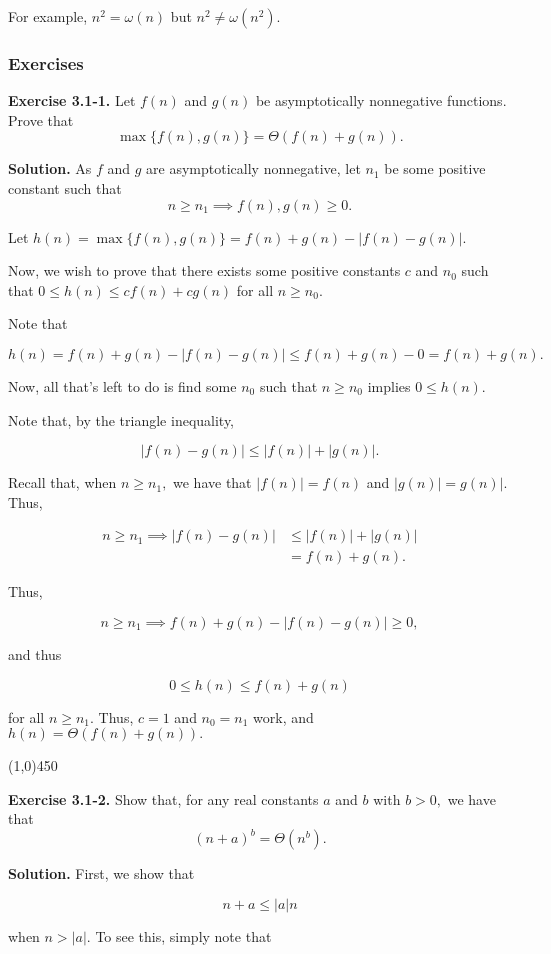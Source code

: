 \documentclass{article}
\newcommand{\exec}[2]
{\textbf{Exercise #1.} #2

\textbf{Solution.}}
\newcommand{\bardiv}{\begin{center}
\line(1,0){450}
\end{center}}
\begin{document}
\vspace{5mm}

For example, $n^2 = \omega(n)$ but $n^2 \neq \omega(n^2).$

\subsubsection{Exercises}

\exec{3.1-1}{Let $f(n)$ and $g(n)$ be asymptotically nonnegative functions. Prove that $$\max\{ f(n), g(n) \} = \Theta(f(n) + g(n)).$$}
As $f$ and $g$ are asymptotically nonnegative, let $n_1$ be some positive constant such that $$n \geq n_1 \implies f(n), g(n) \geq 0.$$

Let $h(n) = \max\{f(n), g(n)\} = f(n) + g(n) - |f(n) - g(n)|.$

Now, we wish to prove that there exists some positive constants $c$ and $n_0$ such that $0 \leq h(n) \leq cf(n) + cg(n)$ for all $n \geq n_0.$

Note that

$$h(n) = f(n) + g(n) - |f(n) - g(n)| \leq f(n) + g(n) - 0 = f(n) + g(n).$$

Now, all that's left to do is find some $n_0$ such that $n \geq n_0$ implies $0 \leq h(n).$

Note that, by the triangle inequality,

$$|f(n) - g(n)| \leq |f(n)| + |g(n)|.$$

Recall that, when $n \geq n_1,$ we have that $|f(n)| = f(n)$ and $|g(n)| = g(n)|.$ Thus,

\begin{align*}
	n \geq n_1 \implies |f(n) - g(n)| &\leq |f(n)| + |g(n)| \\
					  &= f(n) + g(n).
\end{align*}

Thus, 

$$n \geq n_1 \implies f(n) + g(n) - |f(n) - g(n)| \geq 0,$$

and thus

$$0 \leq h(n) \leq f(n) + g(n)$$ 

for all $n \geq n_1.$ Thus, $c=1$ and $n_0 = n_1$ work, and $h(n) = \Theta(f(n) + g(n)).$

\bardiv

\exec{3.1-2}{Show that, for any real constants $a$ and $b$ with $b > 0,$ we have that $$(n+a)^b = \Theta(n^b).$$}
First, we show that

$$n+a \leq |a|n$$

when $n > |a|.$ To see this, simply note that
\end{document}
